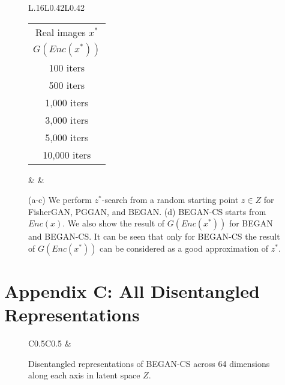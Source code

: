 \documentclass[runningheads]{llncs}
\begin{document}
\begin{figure}[!h]
        \begin{tabular}{L{.16\linewidth}L{0.42\linewidth}L{0.42\linewidth}}
            \begin{tabular}{c}
                \scriptsize Real images $x^*$ \\ [0.9em]
                \scriptsize $G(Enc(x^*))$ \\ [0.9em]
                \scriptsize 100 iters \\ [0.9em]
                \scriptsize 500 iters \\ [0.9em]
                \scriptsize 1{,}000 iters \\ [0.9em]
                \scriptsize 3{,}000 iters \\ [0.9em]
                \scriptsize 5{,}000 iters \\ [0.9em]
                \scriptsize 10{,}000 iters
                \end{tabular} &
             &
        \end{tabular}
        
        \caption{(a-c) We perform $z^*$-search from a random starting point $z \in Z$ for FisherGAN, PGGAN, and BEGAN. (d) BEGAN-CS starts from $Enc(x)$. We also show the result of $G(Enc(x^*))$ for BEGAN and BEGAN-CS. It can be seen that only for BEGAN-CS the result of $G(Enc(x^*))$ can be considered as a good approximation of $z^*$.}
        \label{fig:more-z-search}
    \end{figure}
    
    \vfill
    
    \clearpage
    
    \section{Appendix C: All Disentangled Representations}
    
    \begin{figure}[H]
        \centering
        \begin{tabular}{C{0.5\linewidth}C{0.5\linewidth}}
              &
        \end{tabular}
        \caption{Disentangled representations of BEGAN-CS across 64 dimensions along each axis in latent space $Z$.
        \label{figure:all-disentangled-representations}}
    \end{figure}
\end{document}
